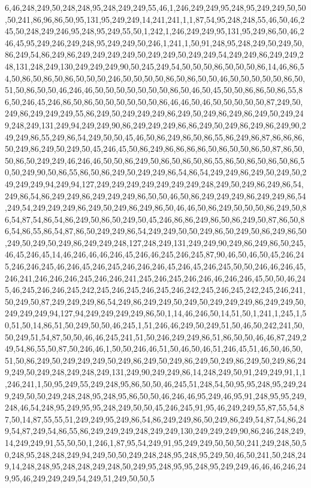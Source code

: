 6,46,248,249,50,248,248,95,248,249,249,55,46,1,246,249,249,95,248,95,249,249,50,50,50,241,86,96,86,50,95,131,95,249,249,14,241,241,1,1,87,54,95,248,248,55,46,50,46,245,50,248,249,246,95,248,95,249,55,50,1,242,1,246,249,249,95,131,95,249,86,50,46,246,45,95,249,246,249,248,95,249,249,50,246,1,241,1,50,91,248,95,248,249,50,249,50,86,249,54,86,249,86,249,249,249,249,50,249,249,50,249,249,54,249,249,86,249,249,248,131,248,249,130,249,249,249,90,50,245,249,54,50,50,50,86,50,50,50,86,14,46,86,54,50,86,50,86,50,86,50,50,50,246,50,50,50,50,86,50,86,50,50,46,50,50,50,50,50,86,50,51,50,86,50,50,46,246,46,50,50,50,50,50,50,50,86,50,46,50,45,50,50,86,86,50,86,55,86,50,246,45,246,86,50,86,50,50,50,50,50,50,86,46,46,50,46,50,50,50,50,50,87,249,50,249,86,249,249,249,55,86,249,50,249,249,249,86,249,50,249,86,249,86,249,50,249,249,248,249,131,249,94,249,249,90,86,249,249,249,86,86,249,50,249,86,249,86,249,90,249,249,86,55,249,86,54,249,50,50,45,46,50,86,249,86,50,86,55,86,249,86,87,86,86,86,50,249,86,249,50,249,50,45,246,45,50,86,249,86,86,86,86,50,86,50,50,86,50,87,86,50,50,86,50,249,249,46,246,46,50,50,86,249,50,86,50,86,50,86,55,86,50,86,50,86,50,86,50,50,249,90,50,86,55,86,50,86,249,50,249,249,86,54,86,54,249,249,86,249,50,249,50,249,249,249,94,249,94,127,249,249,249,249,249,249,249,248,249,50,249,86,249,86,54,249,86,54,86,249,249,86,249,249,249,86,50,50,46,50,86,249,249,249,86,249,249,86,54,249,54,249,249,249,86,249,50,249,86,249,86,50,46,46,50,86,249,50,50,50,86,249,50,86,54,87,54,86,54,86,249,50,86,50,249,50,45,246,86,86,249,86,50,86,249,50,87,86,50,86,54,86,55,86,54,87,86,50,249,249,86,54,249,249,50,50,249,86,50,249,50,86,249,86,50,249,50,249,50,249,86,249,249,248,127,248,249,131,249,249,90,249,86,249,86,50,245,46,45,246,45,14,46,246,46,46,246,45,246,46,245,246,245,87,90,46,50,46,50,45,246,245,246,246,245,46,246,45,246,245,246,246,246,45,246,45,246,245,50,50,246,46,246,45,246,241,246,246,246,245,246,246,241,245,246,245,246,246,46,246,246,45,50,50,46,245,46,245,246,246,245,242,245,246,245,246,245,246,242,245,246,245,242,245,246,241,50,249,50,87,249,249,249,86,54,249,86,249,249,50,249,50,249,249,249,86,249,249,50,249,249,249,94,127,94,249,249,249,249,86,50,1,14,46,246,50,14,51,50,1,241,1,245,1,50,51,50,14,86,51,50,249,50,50,46,245,1,51,246,46,249,50,249,51,50,46,50,242,241,50,50,249,51,54,87,50,50,46,46,245,241,51,50,246,249,249,86,51,86,50,50,46,46,87,249,249,54,86,55,50,87,50,246,46,1,50,50,246,46,51,50,46,50,46,51,246,45,51,46,50,46,50,51,50,86,249,50,249,249,249,50,249,86,249,50,249,86,249,50,249,86,249,50,249,86,249,249,50,249,248,249,248,249,131,249,90,249,249,86,14,248,249,50,91,249,249,91,1,1,246,241,1,50,95,249,55,249,248,95,86,50,50,46,245,51,248,54,50,95,95,248,95,249,249,249,50,50,249,248,248,95,248,95,86,50,50,46,246,46,95,249,46,95,91,248,95,95,249,248,46,54,248,95,249,95,95,248,249,50,50,45,246,245,91,95,46,249,249,55,87,55,54,87,50,14,87,55,55,51,249,249,95,249,86,54,86,249,249,86,50,249,86,249,54,87,54,86,249,54,87,249,54,86,55,86,249,249,249,248,249,249,130,249,249,249,90,86,246,248,249,14,249,249,91,55,50,50,1,246,1,87,95,54,249,91,95,249,249,50,50,50,241,249,248,50,50,248,95,248,248,249,94,249,50,50,249,248,248,95,248,95,249,50,46,50,241,50,248,249,14,248,248,95,248,248,249,248,50,249,95,248,95,95,248,95,249,249,46,46,46,246,249,95,46,249,249,249,54,249,51,249,50,50,5